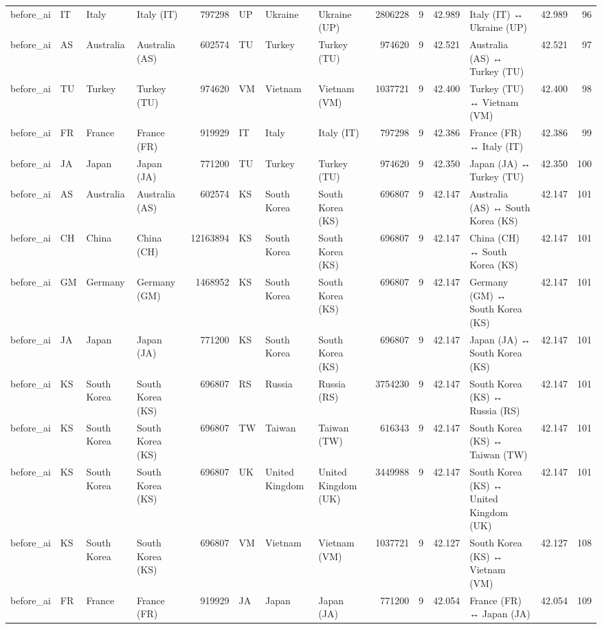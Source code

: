 \begin{tabular}{llllrlllrrrlrr}
before\_ai & IT & Italy & Italy (IT) & 797298 & UP & Ukraine & Ukraine (UP) & 2806228 & 9 & 42.989 & Italy (IT) ↔ Ukraine (UP) & 42.989 & 96 \\
before\_ai & AS & Australia & Australia (AS) & 602574 & TU & Turkey & Turkey (TU) & 974620 & 9 & 42.521 & Australia (AS) ↔ Turkey (TU) & 42.521 & 97 \\
before\_ai & TU & Turkey & Turkey (TU) & 974620 & VM & Vietnam & Vietnam (VM) & 1037721 & 9 & 42.400 & Turkey (TU) ↔ Vietnam (VM) & 42.400 & 98 \\
before\_ai & FR & France & France (FR) & 919929 & IT & Italy & Italy (IT) & 797298 & 9 & 42.386 & France (FR) ↔ Italy (IT) & 42.386 & 99 \\
before\_ai & JA & Japan & Japan (JA) & 771200 & TU & Turkey & Turkey (TU) & 974620 & 9 & 42.350 & Japan (JA) ↔ Turkey (TU) & 42.350 & 100 \\
before\_ai & AS & Australia & Australia (AS) & 602574 & KS & South Korea & South Korea (KS) & 696807 & 9 & 42.147 & Australia (AS) ↔ South Korea (KS) & 42.147 & 101 \\
before\_ai & CH & China & China (CH) & 12163894 & KS & South Korea & South Korea (KS) & 696807 & 9 & 42.147 & China (CH) ↔ South Korea (KS) & 42.147 & 101 \\
before\_ai & GM & Germany & Germany (GM) & 1468952 & KS & South Korea & South Korea (KS) & 696807 & 9 & 42.147 & Germany (GM) ↔ South Korea (KS) & 42.147 & 101 \\
before\_ai & JA & Japan & Japan (JA) & 771200 & KS & South Korea & South Korea (KS) & 696807 & 9 & 42.147 & Japan (JA) ↔ South Korea (KS) & 42.147 & 101 \\
before\_ai & KS & South Korea & South Korea (KS) & 696807 & RS & Russia & Russia (RS) & 3754230 & 9 & 42.147 & South Korea (KS) ↔ Russia (RS) & 42.147 & 101 \\
before\_ai & KS & South Korea & South Korea (KS) & 696807 & TW & Taiwan & Taiwan (TW) & 616343 & 9 & 42.147 & South Korea (KS) ↔ Taiwan (TW) & 42.147 & 101 \\
before\_ai & KS & South Korea & South Korea (KS) & 696807 & UK & United Kingdom & United Kingdom (UK) & 3449988 & 9 & 42.147 & South Korea (KS) ↔ United Kingdom (UK) & 42.147 & 101 \\
before\_ai & KS & South Korea & South Korea (KS) & 696807 & VM & Vietnam & Vietnam (VM) & 1037721 & 9 & 42.127 & South Korea (KS) ↔ Vietnam (VM) & 42.127 & 108 \\
before\_ai & FR & France & France (FR) & 919929 & JA & Japan & Japan (JA) & 771200 & 9 & 42.054 & France (FR) ↔ Japan (JA) & 42.054 & 109 \\

\end{tabular}
